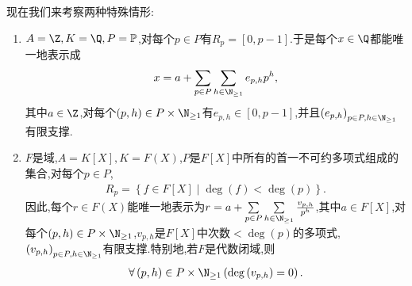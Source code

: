 \begin{remark}{}{}
	现在我们来考察两种特殊情形:
	\begin{enumerate}
		\item $A=\Z,K=\Q,P=\mathbb{P}$,对每个$p\in P$有$R_{p}=\left[0,p-1\right]$.于是每个$x\in\Q$都能唯一地表示成
		\begin{align*}
			x=a+\sum\limits_{p\in P}\sum\limits_{h\in\N_{\geq 1}}e_{p,h}p^{h},
		\end{align*}
		其中$a\in\Z$,对每个$\left(p,h\right)\in P\times\N_{\geq 1}$有$e_{p,h}\in\left[0,p-1\right]$,并且$\left(e_{p,h}\right)_{p\in P,h\in\N_{\geq 1}}$有限支撑.
		\item $F$是域,$A=K[X],K=F(X)$,$P$是$F[X]$中所有的首一不可约多项式组成的集合,对每个$p\in P$,
		\begin{align*}
			R_{p}=\left\{f\in F[X]\middle|\deg\left(f\right)<\deg\left(p\right)\right\}.
		\end{align*}
		因此,每个$r\in F(X)$能唯一地表示为$r=a+\sum\limits_{p\in P}\sum\limits_{h\in\N_{\geq 1}}\frac{v_{p,h}}{p^{h}}$,其中$a\in F[X]$,对每个$\left(p,h\right)\in P\times\N_{\geq 1}$,$v_{p,h}$是$F[X]$中次数$<\deg\left(p\right)$的多项式,$\left(v_{p,h}\right)_{p\in P,h\in\N_{\geq 1}}$有限支撑.特别地,若$F$是代数闭域,则
		\begin{align*}
			\forall\left(p,h\right)\in P\times\N_{\geq 1}\left(\deg\left(v_{p,h}\right)=0\right).
		\end{align*}
	\end{enumerate}
\end{remark}
